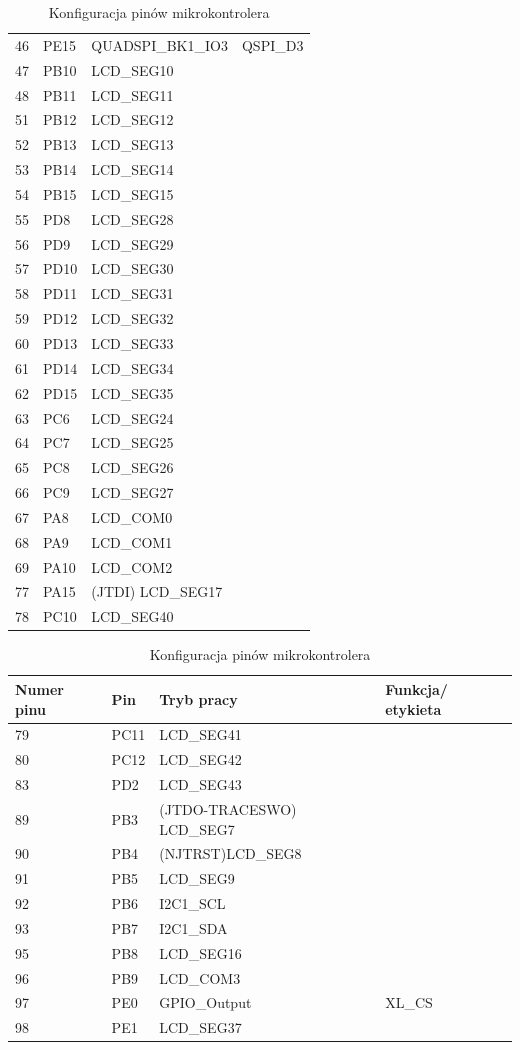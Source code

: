 \documentclass[10pt, a4paper]{article}
\begin{document}
\begin{table}[H]
\begin{tabular}{|l|l|l|l|}
46	&	PE15&	QUADSPI\_BK1\_IO3	&	QSPI\_D3\\
47	&	PB10&	LCD\_SEG10	&\\
48	&	PB11&	LCD\_SEG11	&\\
51	&	PB12&	LCD\_SEG12	&\\
52	&	PB13&	LCD\_SEG13	&\\
53	&	PB14&	LCD\_SEG14	&\\
54 &	PB15&	LCD\_SEG15	&\\
55	&	PD8	&	LCD\_SEG28	&\\
56	&	PD9	&	LCD\_SEG29	&\\
57	&	PD10&	LCD\_SEG30	& \\
58	&	PD11&	LCD\_SEG31	&\\
59	&	PD12&	LCD\_SEG32	&\\
60	&	PD13&	LCD\_SEG33	&\\
61	&	PD14&	LCD\_SEG34	&\\
62	&	PD15&	LCD\_SEG35	&\\
63	&	PC6	&	LCD\_SEG24	&\\
64	&	PC7	&	LCD\_SEG25	&\\
65	&	PC8	&	LCD\_SEG26	&\\
66	&	PC9	&	LCD\_SEG27	&\\
67	&	PA8	&	LCD\_COM0	&\\
68	&	PA9	&	LCD\_COM1	&\\
69	&	PA10&	LCD\_COM2	&\\
77	&	PA15 &	(JTDI) LCD\_SEG17&	\\
78	&	PC10&	LCD\_SEG40	&\\ \hline

\end{tabular}
\caption{Konfiguracja pinów mikrokontrolera}
\end{table}

\begin{table}[H]
\centering
\begin{tabular}{|l|l|l|l|}
\hline
\textbf{Numer pinu} & \textbf{Pin} & \textbf{Tryb pracy} & \textbf{Funkcja/ etykieta} \\ \hline \hline
79	&	PC11&	LCD\_SEG41	&\\
80	&	PC12&	LCD\_SEG42	&\\
83	&	PD2	&	LCD\_SEG43	&\\
89	&	PB3 &	(JTDO-TRACESWO)	LCD\_SEG7&\\	
90	&	PB4 &	(NJTRST)LCD\_SEG8	&\\
91	&	PB5	&	LCD\_SEG9	&\\
92	&	PB6	&	I2C1\_SCL	&\\
93	&	PB7	&	I2C1\_SDA	&\\
95	&	PB8	&	LCD\_SEG16	&\\
96	&	PB9	&	LCD\_COM3	&\\
97	&	PE0	&	GPIO\_Output	&		XL\_CS\\
98	&	PE1	&	LCD\_SEG37	&\\ \hline
\end{tabular}
\caption{Konfiguracja pinów mikrokontrolera}
\end{table}
\end{document}
